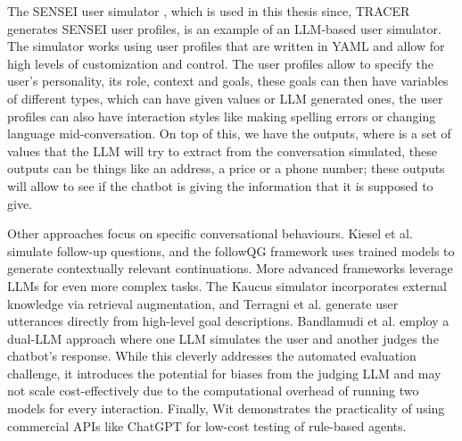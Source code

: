 The SENSEI user simulator \autocite{delaraAutomatedEndtoEndTesting2025, delaraSensei},
which is used in this thesis since, \ac{TRACER} generates SENSEI user profiles,
is an example of an \ac{LLM}-based user simulator.
The simulator works using user profiles
that are written in YAML
and allow for high levels of customization and control.
The user profiles allow to specify the user's
personality, its role, context and goals,
these goals can then have variables of different types,
which can have given values or \ac{LLM} generated ones,
the user profiles can also have interaction styles like
making spelling errors or changing language mid-conversation.
On top of this, we have the outputs,
where is a set of values that the \ac{LLM}
will try to extract from the conversation simulated,
these outputs can be things like an address, a price or a phone number;
these outputs will allow
to see if the chatbot is giving the information
that it is supposed to give.


Other approaches focus on specific conversational behaviours.
Kiesel et al. \autocite{kieselSimulatingFollowUpQuestions2024}
simulate follow-up questions,
and the followQG framework \autocite{bImprovingAsynchronousInterview2021}
uses trained models to generate contextually relevant continuations.
More advanced frameworks leverage \acp{LLM} for even more complex tasks.
The Kaucus simulator \autocite{dholeKAUCUSKnowledgeAugmented2024}
incorporates external knowledge via retrieval augmentation,
and Terragni et al. \autocite{terragniInContextLearningUser2023}
generate user utterances directly from high-level goal descriptions.
Bandlamudi et al. \autocite{bandlamudiFrameworkEnableTest2024}
employ a dual-\ac{LLM} approach where
one \ac{LLM} simulates the user and
another judges the chatbot's response.
While this cleverly addresses the automated evaluation challenge,
it introduces the potential for biases from the judging LLM
and may not scale cost-effectively due to the computational overhead
of running two models for every interaction.
Finally, Wit \autocite{dewitLeveragingLargeLanguage2024}
demonstrates the practicality of using commercial APIs like ChatGPT
for low-cost testing of rule-based agents.

